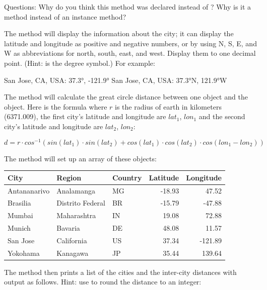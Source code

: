 \begin{exercise}
Questions: Why do you think this method was declared  instead of ? Why is it a  method instead of an instance method?

The  method will display the information about the city; it can display the latitude and longitude as positive and negative numbers, or by using N, S, E, and W as abbreviations for north, south, east, and west. Display them to one decimal point. (Hint:  is the degree symbol.) For example:

\begin{stdout}
San Jose, CA, USA: 37.3°, -121.9°
San Jose, CA, USA: 37.3°N, 121.9°W
\end{stdout}


The  method will calculate the great circle distance between one  object and the   object. Here is the formula where $r$ is the radius of earth in kilometers (6371.009), the first city's latitude and longitude are $lat_1$, $lon_1$ and the second city's latitude and longitude are  $lat_2$, $lon_2$:

\begin{equation*}
d = r\cdot cos^{-1}(sin(lat_1)\cdot sin(lat_2) + cos(lat_1)\cdot cos(lat_2)\cdot cos(lon_1 - lon_2))
\end{equation*}

The  method will set up an array of these  objects:

\begin{tabular}{|l|l|l|r|r|}
\hline
City & Region & Country & Latitude & Longitude \\ \hline
Antananarivo & Analamanga & MG & -18.93 & 47.52 \\ \hline
Brasilia & Distrito Federal & BR & -15.79 & -47.88 \\ \hline
Mumbai & Maharashtra & IN & 19.08 & 72.88 \\ \hline
Munich & Bavaria & DE & 48.08 & 11.57 \\ \hline
San Jose & California & US & 37.34 & -121.89 \\ \hline
Yokohama & Kanagawa & JP & 35.44 & 139.64 \\ \hline
\end{tabular}

The  method then prints a list of the cities and the inter-city distances with output as follows. Hint: use  to round the distance to an integer:


\end{exercise}
